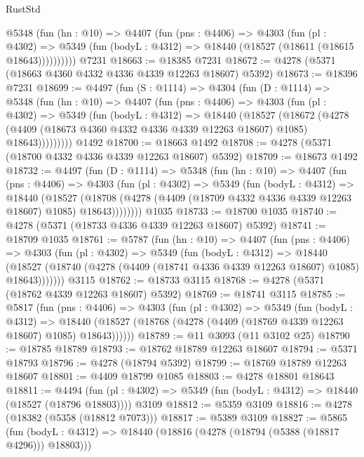 \begin{lexlean}{RustStd}
\begin{coremodule}
{\begin{coremodule}
{{{{{{{{{{{{{{{{{{{{{{{{{{{{{{{{{{{        @5348
          (fun (hn : @10) =>
          @4407
            (fun (pns : @4406) =>
            @4303
              (fun (pl : @4302) =>
              @5349 (fun (bodyL : @4312) => @18440 (@18527 (@18611 (@18615 @18643))))))))))
    @7231
@18663 := @18385 @7231
@18672 := @4278 (@5371 (@18663 @4360 @4332 @4336 @4339 @12263 @18607) @5392)
@18673 := @18396 @7231
@18699 := @4497
    (fun (S : @1114) =>
    @4304
      (fun (D : @1114) =>
      @5348
        (fun (hn : @10) =>
        @4407
          (fun (pns : @4406) =>
          @4303
            (fun (pl : @4302) =>
            @5349
              (fun (bodyL : @4312) =>
              @18440
                (@18527
                  (@18672
                    (@4278
                      (@4409 (@18673 @4360 @4332 @4336 @4339 @12263 @18607) @1085)
                      @18643)))))))))
    @1492
@18700 := @18663 @1492
@18708 := @4278 (@5371 (@18700 @4332 @4336 @4339 @12263 @18607) @5392)
@18709 := @18673 @1492
@18732 := @4497
    (fun (D : @1114) =>
    @5348
      (fun (hn : @10) =>
      @4407
        (fun (pns : @4406) =>
        @4303
          (fun (pl : @4302) =>
          @5349
            (fun (bodyL : @4312) =>
            @18440
              (@18527
                (@18708 (@4278 (@4409 (@18709 @4332 @4336 @4339 @12263 @18607) @1085) @18643))))))))
    @1035
@18733 := @18700 @1035
@18740 := @4278 (@5371 (@18733 @4336 @4339 @12263 @18607) @5392)
@18741 := @18709 @1035
@18761 := @5787
    (fun (hn : @10) =>
    @4407
      (fun (pns : @4406) =>
      @4303
        (fun (pl : @4302) =>
        @5349
          (fun (bodyL : @4312) =>
          @18440
            (@18527 (@18740 (@4278 (@4409 (@18741 @4336 @4339 @12263 @18607) @1085) @18643)))))))
    @3115
@18762 := @18733 @3115
@18768 := @4278 (@5371 (@18762 @4339 @12263 @18607) @5392)
@18769 := @18741 @3115
@18785 := @5817
    (fun (pns : @4406) =>
    @4303
      (fun (pl : @4302) =>
      @5349
        (fun (bodyL : @4312) =>
        @18440 (@18527 (@18768 (@4278 (@4409 (@18769 @4339 @12263 @18607) @1085) @18643))))))
@18789 := @11 @3093 (@11 @3102 @25)
@18790 := @18785 @18789
@18793 := @18762 @18789 @12263 @18607
@18794 := @5371 @18793
@18796 := @4278 (@18794 @5392)
@18799 := @18769 @18789 @12263 @18607
@18801 := @4409 @18799 @1085
@18803 := @4278 @18801 @18643
@18811 := @4494
    (fun (pl : @4302) => @5349 (fun (bodyL : @4312) => @18440 (@18527 (@18796 @18803))))
    @3109
@18812 := @5359 @3109
@18816 := @4278 (@18382 (@5358 (@18812 @7073)))
@18817 := @5389 @3109
@18827 := @5865
    (fun (bodyL : @4312) => @18440 (@18816 (@4278 (@18794 (@5388 (@18817 @4296))) @18803)))
}}}}}}}}}}}}}}}}}}}}}}}}}}}}}}}}}}}
\end{coremodule}}
\end{coremodule}
\end{lexlean}
